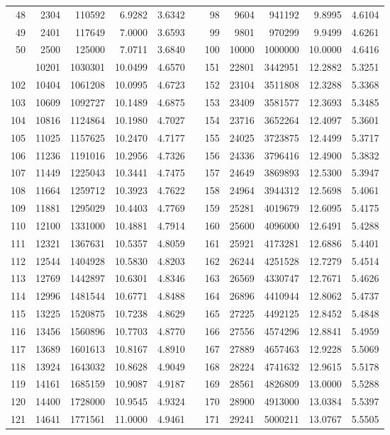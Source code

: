 \begin{longtable}{rrrrrrrrrrr}
48&2304&110592&6.9282&3.6342&&98&9604&941192&9.8995&4.6104\\
49&2401&117649&7.0000&3.6593&&99&9801&970299&9.9499&4.6261\\
50&2500&125000&7.0711&3.6840&&100&10000&1000000&10.0000&4.6416\\
\newpage
101&10201&1030301&10.0499&4.6570&&151&22801&3442951&12.2882&5.3251\\
102&10404&1061208&10.0995&4.6723&&152&23104&3511808&12.3288&5.3368\\
103&10609&1092727&10.1489&4.6875&&153&23409&3581577&12.3693&5.3485\\
104&10816&1124864&10.1980&4.7027&&154&23716&3652264&12.4097&5.3601\\
105&11025&1157625&10.2470&4.7177&&155&24025&3723875&12.4499&5.3717\\
106&11236&1191016&10.2956&4.7326&&156&24336&3796416&12.4900&5.3832\\
107&11449&1225043&10.3441&4.7475&&157&24649&3869893&12.5300&5.3947\\
108&11664&1259712&10.3923&4.7622&&158&24964&3944312&12.5698&5.4061\\
109&11881&1295029&10.4403&4.7769&&159&25281&4019679&12.6095&5.4175\\
110&12100&1331000&10.4881&4.7914&&160&25600&4096000&12.6491&5.4288\\
111&12321&1367631&10.5357&4.8059&&161&25921&4173281&12.6886&5.4401\\
112&12544&1404928&10.5830&4.8203&&162&26244&4251528&12.7279&5.4514\\
113&12769&1442897&10.6301&4.8346&&163&26569&4330747&12.7671&5.4626\\
114&12996&1481544&10.6771&4.8488&&164&26896&4410944&12.8062&5.4737\\
115&13225&1520875&10.7238&4.8629&&165&27225&4492125&12.8452&5.4848\\
116&13456&1560896&10.7703&4.8770&&166&27556&4574296&12.8841&5.4959\\
117&13689&1601613&10.8167&4.8910&&167&27889&4657463&12.9228&5.5069\\
118&13924&1643032&10.8628&4.9049&&168&28224&4741632&12.9615&5.5178\\
119&14161&1685159&10.9087&4.9187&&169&28561&4826809&13.0000&5.5288\\
120&14400&1728000&10.9545&4.9324&&170&28900&4913000&13.0384&5.5397\\
121&14641&1771561&11.0000&4.9461&&171&29241&5000211&13.0767&5.5505\\

\end{longtable}
